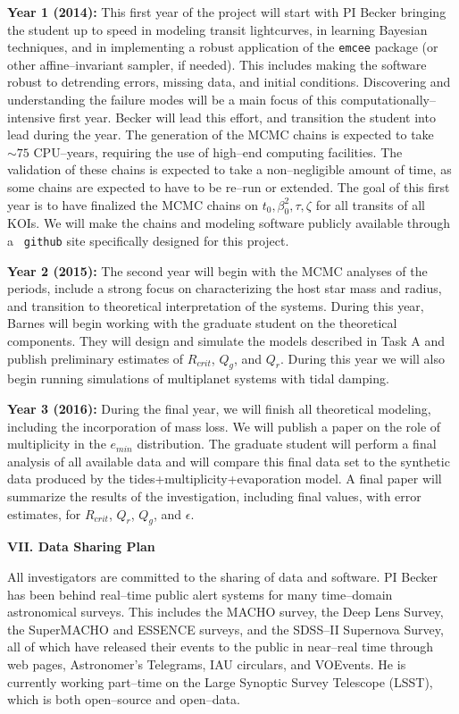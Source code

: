 {\bf Year 1 (2014):} This first year of the project will start with PI
Becker bringing the student up to speed in modeling transit
lightcurves, in learning Bayesian techniques, and in implementing a
robust application of the {\tt emcee} package (or other
affine--invariant sampler, if needed).  This includes making the
software robust to detrending errors, missing data, and initial
conditions.  Discovering and understanding the failure modes will be a
main focus of this computationally--intensive first year.  Becker will
lead this effort, and transition the student into lead during the
year.  The generation of the MCMC chains is expected to take $\sim 75$
CPU--years, requiring the use of high--end computing facilities. The
validation of these chains is expected to take a non--negligible amount of
time, as some chains are expected to have to be re--run or extended.
The goal of this first year is to have finalized the MCMC chains on
$t_0, \beta_0^2, \tau, \zeta$ for all transits of all KOIs.  We will
make the chains and modeling software publicly available through a {\tt
github} site specifically designed for this project.

{\bf Year 2 (2015):} The second year will begin with the MCMC analyses
of the periods, include a strong focus on characterizing the host star
mass and radius, and transition to theoretical interpretation of the
systems.  During this year, Barnes will begin working with the
graduate student on the theoretical components. They will design and
simulate the models described in Task A and publish preliminary
estimates of $R_{crit}$, $Q_g$, and $Q_r$. During this year we will
also begin running simulations of multiplanet systems with tidal
damping.

{\bf Year 3 (2016):} During the final year, we will finish all
theoretical modeling, including the incorporation of mass loss.  We
will publish a paper on the role of multiplicity in the $e_{min}$
distribution. The graduate student will perform a final analysis of
all available \kepler data and will compare this final data set to the
synthetic data produced by the tides+multiplicity+evaporation model.
A final paper will summarize the results of the investigation,
including final values, with error estimates, for $R_{crit}$, $Q_r$,
$Q_g$, and $\epsilon$.  


\bigskip
\centerline{\bf VII. Data Sharing Plan}
\smallskip

All investigators are committed to the sharing of data and software.
PI Becker has been behind real--time public alert systems for many
time--domain astronomical surveys.  This includes the MACHO survey,
the Deep Lens Survey, the SuperMACHO and ESSENCE surveys, and the
SDSS--II Supernova Survey, all of which have released their events to
the public in near--real time through web pages, Astronomer's
Telegrams, IAU circulars, and VOEvents.  He is currently
working part--time on the Large Synoptic Survey Telescope (LSST),
which is both open--source and open--data.

